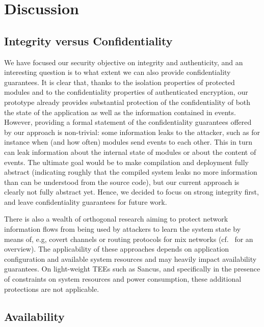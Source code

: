 \section{Discussion}
\label{sec:discussion}

\subsection{Integrity versus Confidentiality}
\label{sec:discussion:confidentiality}
%
We have focused our security objective on integrity and authenticity, and
an interesting question is to what extent we can also provide
confidentiality guarantees. It is clear that, thanks to the isolation
properties of protected modules and  to the confidentiality properties of
authenticated encryption, our prototype already provides substantial
protection of the confidentiality of both the state of the application as
well as the information contained in events. However, providing a formal
statement of the confidentiality guarantees offered by our approach is
non-trivial: some information leaks to the attacker, such as for instance
when (and how often) modules send events to each other.  This in turn can
leak information about the internal state of modules or about the content
of events. The ultimate goal would be to make compilation and deployment
fully abstract \cite{abadi} (indicating roughly that the compiled system
leaks no more information than can be understood from the source code), but
our current approach is clearly not fully abstract yet.
Hence, we decided
to focus on strong integrity first, and leave confidentiality guarantees
for future work.

There is also a wealth of orthogonal research aiming to protect network
information flows from being used by attackers to learn the system state by
means of, e.g, covert channels or routing protocols for mix networks
(cf.~\cite{shirazi2019anonymous} for an overview). The applicability of these
approaches depends on application configuration and available system resources
and may heavily impact availability guarantees. On light-weight \acp{TEE} such
as Sancus, and specifically in the presence of constraints on system resources
and power consumption, these additional protections are not applicable.

\subsection{Availability}
\label{sec:discussion:availability}

